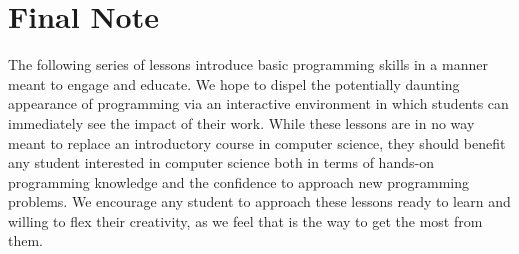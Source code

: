 \documentclass{article}
\begin{document}
\section{Final Note}

The following series of lessons introduce basic programming skills in a manner meant to engage and educate. We hope to dispel the potentially daunting appearance of programming via an interactive environment in which students can immediately see the impact of their work. While these lessons are in no way meant to replace an introductory course in computer science, they should benefit any student interested in computer science both in terms of hands-on programming knowledge and the confidence to approach new programming problems. We encourage any student to approach these lessons ready to learn and willing to flex their creativity, as we feel that is the way to get the most from them.
\end{document}
